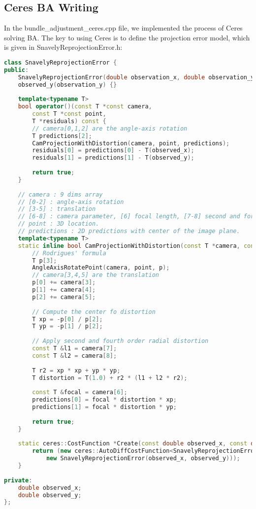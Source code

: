 \subsection{Ceres BA Writing}
In the bundle\_adjustment\_ceres.cpp file, we implemented the process of Ceres solving BA. The key to using Ceres is to define the projection error model, which is given in SnavelyReprojectionError.h:

\begin{lstlisting}[language=c++, caption=slambook2/ch9/SnavelyReprojectionError.cpp（片段）]
class SnavelyReprojectionError {
public:
	SnavelyReprojectionError(double observation_x, double observation_y) : observed_x(observation_x),
	observed_y(observation_y) {}
	
	template<typename T>
	bool operator()(const T *const camera,
		const T *const point,
		T *residuals) const {
		// camera[0,1,2] are the angle-axis rotation
		T predictions[2];
		CamProjectionWithDistortion(camera, point, predictions);
		residuals[0] = predictions[0] - T(observed_x);
		residuals[1] = predictions[1] - T(observed_y);
		
		return true;
	}
	
	// camera : 9 dims array
	// [0-2] : angle-axis rotation
	// [3-5] : translation
	// [6-8] : camera parameter, [6] focal length, [7-8] second and forth order radial distortion
	// point : 3D location.
	// predictions : 2D predictions with center of the image plane.
	template<typename T>
	static inline bool CamProjectionWithDistortion(const T *camera, const T *point, T *predictions) {
		// Rodrigues' formula
		T p[3];
		AngleAxisRotatePoint(camera, point, p);
		// camera[3,4,5] are the translation
		p[0] += camera[3];
		p[1] += camera[4];
		p[2] += camera[5];
		
		// Compute the center fo distortion
		T xp = -p[0] / p[2];
		T yp = -p[1] / p[2];
		
		// Apply second and fourth order radial distortion
		const T &l1 = camera[7];
		const T &l2 = camera[8];
		
		T r2 = xp * xp + yp * yp;
		T distortion = T(1.0) + r2 * (l1 + l2 * r2);
		
		const T &focal = camera[6];
		predictions[0] = focal * distortion * xp;
		predictions[1] = focal * distortion * yp;
		
		return true;
	}
	
	static ceres::CostFunction *Create(const double observed_x, const double observed_y) {
		return (new ceres::AutoDiffCostFunction<SnavelyReprojectionError, 2, 9, 3>(
			new SnavelyReprojectionError(observed_x, observed_y)));
	}
	
private:
	double observed_x;
	double observed_y;
};
\end{lstlisting}
